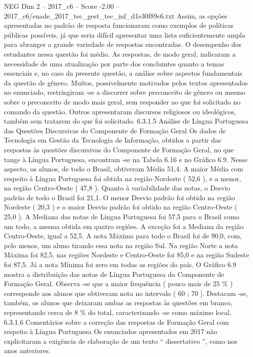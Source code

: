 \begin{textsample}{NEG Dim 2 – 2017\_c6 – Score -2.00 – 2017\_c6/enade\_2017\_tec\_gest\_tec\_inf\_d1e30f89c6.txt}
Assim, as opções apresentadas no padrão de resposta funcionaram como exemplos de políticas públicas possíveis, já que seria difícil apresentar uma lista suficientemente ampla para abranger a grande variedade de respostas encontradas.
O desempenho dos estudantes nessa questão foi médio.
As respostas, de modo geral, indicaram a necessidade de uma atualização por parte dos concluintes quanto a temas essenciais e, no caso da presente questão, a análise sobre aspectos fundamentais da questão de gênero.
Muitos, possivelmente motivados pelos textos apresentados no enunciado, restringiram -se a discorrer sobre preconceito de gênero ou mesmo sobre o preconceito de modo mais geral, sem responder ao que foi solicitado no comando da questão.
Outros apresentaram discursos religiosos ou ideológicos, também sem tratarem do que foi solicitado. 6.3.1.5 Análise de Língua Portuguesa das Questões Discursivas do Componente de Formação Geral Os dados de Tecnologia em Gestão da Tecnologia de Informação, obtidos a partir das respostas às questões discursivas do Componente de Formação Geral, no que tange à Língua Portuguesa, encontram -se na Tabela 6.16 e no Gráfico 6.9.
Nesse aspecto, os alunos, de todo o Brasil, obtiveram Média 51,4.
A maior Média com respeito à Língua Portuguesa foi obtida na região Nordeste ( 52,6 ), e a menor, na região Centro-Oeste ( 47,8 ).
Quanto à variabilidade das notas, o Desvio padrão de todo o Brasil foi 21,1.
O menor Desvio padrão foi obtido na região Nordeste ( 20,3 ) e o maior Desvio padrão foi obtido na região Centro-Oeste ( 25,0 ).
A Mediana das notas de Língua Portuguesa foi 57,5 para o Brasil como um todo, a mesma obtida em quatro regiões.
A exceção foi a Mediana da região Centro-Oeste, igual a 52,5.
A nota Máxima para todo o Brasil foi de 90,0, com, pelo menos, um aluno tirando essa nota na região Sul.
Na região Norte a nota Máxima foi 82,5, nas regiões Nordeste e Centro-Oeste foi 85,0 e na região Sudeste foi 87,5.
Já a nota Mínima foi zero em todas as regiões do país.
O Gráfico 6.9 mostra a distribuição das notas de Língua Portuguesa do Componente de Formação Geral.
Observa -se que a maior frequência ( pouco mais de 25 \% ) corresponde aos alunos que obtiveram nota no intervalo ( 60 ; 70 ].
Destacam -se, também, os alunos que deixaram ambas as respostas às questões em branco, representando cerca de 8 \% do total, caracterizando -se como máximo local. 6.3.1.6 Comentários sobre a correção das respostas de Formação Geral com respeito à Língua Portuguesa Os enunciados apresentados em 2017 não explicitaram a exigência de elaboração de um texto “ dissertativo ”, como nos anos anteriores.

\end{textsample}
